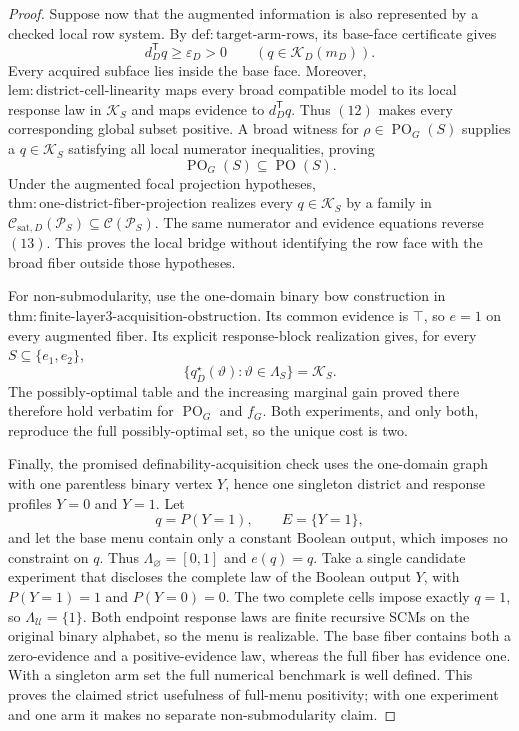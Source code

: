 \documentclass{article}
\begin{document}
\begin{proof}
Suppose now that the augmented information is also represented by a checked local
row system.  By \(\mathrm{def:target\text{-}arm\text{-}rows}\), its base-face
certificate gives
\[
d_D^{\mathsf T}q\geq\varepsilon_D>0
\qquad(q\in\mathcal K_D(m_D)).
\tag{12}
\]
Every acquired subface lies inside the base face.  Moreover,
\(\mathrm{lem:district\text{-}cell\text{-}linearity}\) maps every broad compatible
model to its local response law in \(\mathcal K_S\) and maps evidence to
\(d_D^{\mathsf T}q\).  Thus \((12)\) makes every corresponding global subset
positive.  A broad witness for \(\rho\in\operatorname{PO}_G(S)\) supplies a
\(q\in\mathcal K_S\) satisfying all local numerator inequalities, proving
\[
\operatorname{PO}_G(S)\subseteq\operatorname{PO}(S).
\tag{13}
\]
Under the augmented focal projection hypotheses,
\(\mathrm{thm:one\text{-}district\text{-}fiber\text{-}projection}\) realizes every
\(q\in\mathcal K_S\) by a family in
\(\mathcal C_{\mathrm{sat},D}(\mathcal P_S)\subseteq\mathcal C(\mathcal P_S)\).
The same numerator and evidence equations reverse \((13)\).  This proves the local
bridge without identifying the row face with the broad fiber outside those
hypotheses.

For non-submodularity, use the one-domain binary bow construction in
\(\mathrm{thm:finite\text{-}layer3\text{-}acquisition\text{-}obstruction}\).  Its
common evidence is \(\top\), so \(e=1\) on every augmented fiber.  Its explicit
response-block realization gives, for every \(S\subseteq\{e_1,e_2\}\),
\[
\{q_D^\star(\vartheta):\vartheta\in\Lambda_S\}=\mathcal K_S.
\tag{14}
\]
The possibly-optimal table and the increasing marginal gain proved there therefore
hold verbatim for \(\operatorname{PO}_G\) and \(f_G\).  Both experiments, and only
both, reproduce the full possibly-optimal set, so the unique cost is two.

Finally, the promised definability-acquisition check uses the one-domain graph with
one parentless binary vertex \(Y\), hence one singleton district and response
profiles \(Y=0\) and \(Y=1\).  Let
\[
q=P(Y=1),\qquad E=\{Y=1\},
\tag{15}
\]
and let the base menu contain only a constant Boolean output, which imposes no
constraint on \(q\).  Thus \(\Lambda_{\varnothing}=[0,1]\) and \(e(q)=q\).  Take a
single candidate experiment that discloses the complete law of the Boolean output
\(Y\), with \(P(Y=1)=1\) and \(P(Y=0)=0\).  The two complete cells impose exactly
\(q=1\), so \(\Lambda_{\mathcal U}=\{1\}\).  Both endpoint response laws are finite
recursive SCMs on the original binary alphabet, so the menu is realizable.  The
base fiber contains both a zero-evidence and a positive-evidence law, whereas the
full fiber has evidence one.  With a singleton arm set the full numerical benchmark
is well defined.  This proves the claimed strict usefulness of full-menu positivity;
with one experiment and one arm it makes no separate non-submodularity claim.
\end{proof}
\end{document}
